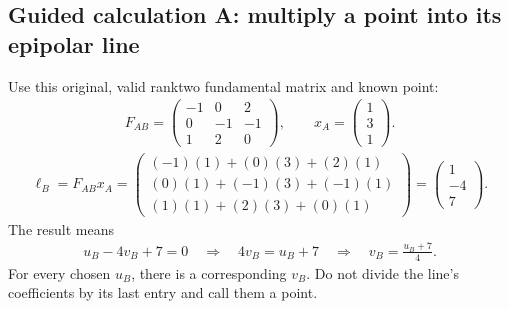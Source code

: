 \documentclass[letterpaper,11pt,english,openany,oneside]{jupyterBook}
\begin{document}
\subsection{Guided calculation A: multiply a point into its epipolar line}
\label{\detokenize{lectures/lecture04/epipolar-practice:guided-calculation-a-multiply-a-point-into-its-epipolar-line}}\label{\detokenize{lectures/lecture04/epipolar-practice:epipolar-point-line}}
\sphinxAtStartPar
Use this original, valid rank\sphinxhyphen{}two fundamental matrix and known point:
\begin{equation*}
\begin{split}
F_{AB}=\begin{pmatrix}-1&0&2\\0&-1&-1\\1&2&0\end{pmatrix},
\qquad x_A=\begin{pmatrix}1\\3\\1\end{pmatrix}.
\end{split}
\end{equation*}
\sphinxAtStartPar
{}
\begin{equation*}
\begin{split}
\ell_B=F_{AB}x_A
=\begin{pmatrix}
(-1)(1)+(0)(3)+(2)(1)\\
(0)(1)+(-1)(3)+(-1)(1)\\
(1)(1)+(2)(3)+(0)(1)
\end{pmatrix}
=\begin{pmatrix}1\\-4\\7\end{pmatrix}.
\end{split}
\end{equation*}
\sphinxAtStartPar
{} The result means
\begin{equation*}
\begin{split}u_B-4v_B+7=0
\quad\Longrightarrow\quad
4v_B=u_B+7
\quad\Longrightarrow\quad
v_B=\frac{u_B+7}{4}.\end{split}
\end{equation*}
\sphinxAtStartPar
For every chosen \(u_B\), there is a corresponding \(v_B\).  Do not divide the line’s coefficients by its last entry and call them a point.
\end{document}
